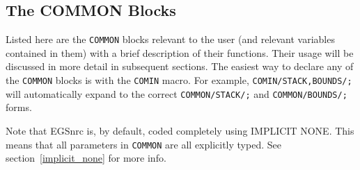 \clearpage

\subsection{ The COMMON Blocks}

\label{common_blocks} 
Listed here are the {\tt COMMON} blocks relevant to the user (and
relevant variables contained in them) with a brief description of their
functions.  Their usage will be discussed in more detail in subsequent
sections.  The easiest way to declare any of the {\tt COMMON} blocks is with
the {\tt COMIN} macro.  For example, {\tt COMIN/STACK,BOUNDS/;} will automatically
expand to the correct {\tt COMMON/STACK/;} and {\tt COMMON/BOUNDS/;} forms.

Note that EGSnrc is, by default, coded completely using IMPLICIT NONE. This
means that all parameters in {\tt COMMON} are all explicitly typed. See
section~\ref{implicit_none}  for more info.

